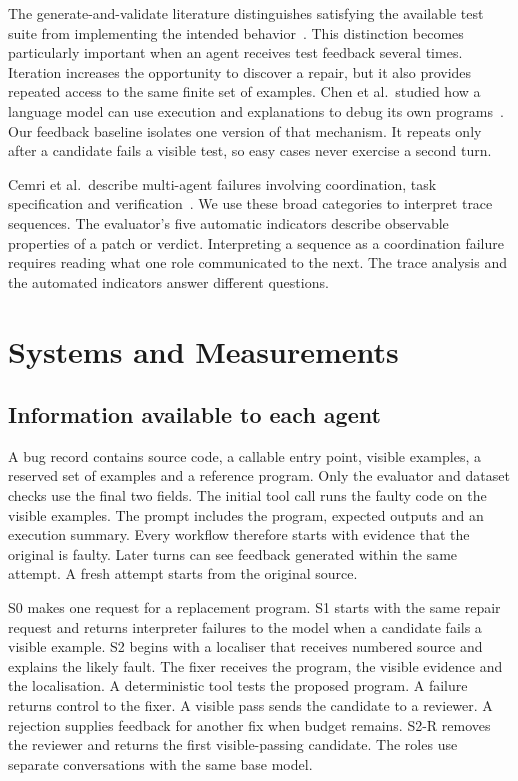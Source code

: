 \documentclass[conference]{IEEEtran}
\begin{document}
The generate-and-validate literature distinguishes satisfying the available test suite from implementing the intended behavior~\cite{qi}. This distinction becomes particularly important when an agent receives test feedback several times. Iteration increases the opportunity to discover a repair, but it also provides repeated access to the same finite set of examples. Chen et al.\ studied how a language model can use execution and explanations to debug its own programs~\cite{chen}. Our feedback baseline isolates one version of that mechanism. It repeats only after a candidate fails a visible test, so easy cases never exercise a second turn.

Cemri et al.\ describe multi-agent failures involving coordination, task specification and verification~\cite{mast}. We use these broad categories to interpret trace sequences. The evaluator's five automatic indicators describe observable properties of a patch or verdict. Interpreting a sequence as a coordination failure requires reading what one role communicated to the next. The trace analysis and the automated indicators answer different questions.

\section{Systems and Measurements}
\subsection{Information available to each agent}
A bug record contains source code, a callable entry point, visible examples, a reserved set of examples and a reference program. Only the evaluator and dataset checks use the final two fields. The initial tool call runs the faulty code on the visible examples. The prompt includes the program, expected outputs and an execution summary. Every workflow therefore starts with evidence that the original is faulty. Later turns can see feedback generated within the same attempt. A fresh attempt starts from the original source.

S0 makes one request for a replacement program. S1 starts with the same repair request and returns interpreter failures to the model when a candidate fails a visible example. S2 begins with a localiser that receives numbered source and explains the likely fault. The fixer receives the program, the visible evidence and the localisation. A deterministic tool tests the proposed program. A failure returns control to the fixer. A visible pass sends the candidate to a reviewer. A rejection supplies feedback for another fix when budget remains. S2-R removes the reviewer and returns the first visible-passing candidate. The roles use separate conversations with the same base model.
\end{document}
